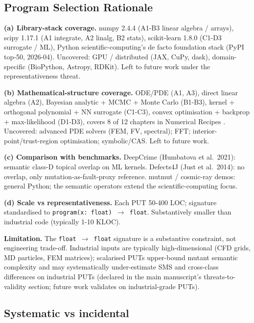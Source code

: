 \documentclass[manuscript,screen,review]{acmart}
\begin{document}
\subsection{Program Selection Rationale}\label{b.1-put-selection-rationale-detailed-coverage-argument}

\textbf{(a) Library-stack coverage.} numpy 2.4.4 (A1-B3 linear algebra /
arrays), scipy 1.17.1 (A1 integrate, A2 linalg, B2 stats), scikit-learn
1.8.0 (C1-D3 surrogate / ML), Python scientific-computing's de facto
foundation stack (PyPI top-50, 2026-04). Uncovered: GPU / distributed
(JAX, CuPy, dask), domain-specific (BioPython, Astropy, RDKit). Left to
future work under the representativeness threat.

\textbf{(b) Mathematical-structure coverage.} ODE/PDE (A1, A3), direct
linear algebra (A2), Bayesian analytic + MCMC + Monte Carlo (B1-B3),
kernel + orthogonal polynomial + NN surrogate (C1-C3), convex
optimisation + backprop + max-likelihood (D1-D3), covers 8 of 12
chapters in Numerical Recipes \citep{press2007numerical}. Uncovered: advanced
PDE solvers (FEM, FV, spectral); FFT; interior-point/trust-region
optimisation; symbolic/CAS. Left to future work.

\textbf{(c) Comparison with benchmarks.} DeepCrime (Humbatova et
al.~2021): semantic class-D topical overlap on ML kernels. Defects4J (Just et
al.~2014): no overlap, only mutation-as-fault-proxy reference. mutmut /
cosmic-ray demos: general Python; the semantic operators extend the scientific-computing focus.

\textbf{(d) Scale vs representativeness.} Each PUT 50-400 LOC; signature
standardised to \texttt{program(x:\ float)\ $\to$\ float}. Substantively
smaller than industrial code (typically 1-10 KLOC).

\textbf{Limitation.} The \texttt{float\ $\to$\ float} signature is a
substantive constraint, not engineering trade-off. Industrial inputs are
typically high-dimensional (CFD grids, MD particles, FEM matrices);
scalarised PUTs upper-bound mutant semantic complexity and may
systematically under-estimate SMS and cross-class differences on
industrial PUTs (declared in the main manuscript's threats-to-validity section;
future work validates on industrial-grade PUTs).

\subsection{Systematic vs incidental}\label{b.1.5-systematic-vs-incidental}
\end{document}

